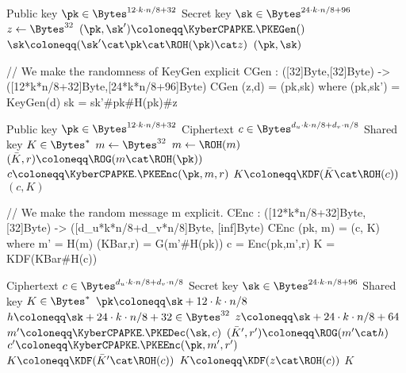\begin{algorithm}
  \caption{$\KyberCCAKEM.\KEMGen()$
  \label{alg:ccakeygen}}
  \begin{algorithmic}[1]
    \Ensure Public key $\pk \in \Bytes^{12\cdot k\cdot n/8 + 32}$
    \Ensure Secret key $\sk \in \Bytes^{24\cdot k\cdot n/8 + 96}$
    \State $z \gets \Bytes^{32}$
    \State $(\pk,\sk') \coloneqq \KyberCPAPKE.\PKEGen()$
    \State $\sk \coloneqq (\sk'\cat \pk\cat \ROH(\pk)\cat z)$
    \State \Return $(\pk, \sk)$
  \end{algorithmic}
\end{algorithm}

\begin{code}
  // We make the randomness of KeyGen explicit
  CGen : ([32]Byte,[32]Byte) -> ([12*k*n/8+32]Byte,[24*k*n/8+96]Byte)
  CGen (z,d) = (pk,sk) where
    (pk,sk') = KeyGen(d)
    sk = sk'#pk#H(pk)#z
\end{code}

\begin{algorithm}
  \caption{$\KyberCCAKEM.\KEMEnc(\pk)$
  \label{alg:ccaenc}}
  \begin{algorithmic}[1]
    \Require Public key $\pk \in \Bytes^{12\cdot k\cdot n/8 + 32}$
    \Ensure Ciphertext $c \in \Bytes^{d_u\cdot k\cdot n/8 + d_v\cdot n/8}$
    \Ensure Shared key $K \in \Bytes^*$
    \State $m\gets \Bytes^{32}$\label{line:ccaenc:m}
    \State $m\gets \ROH(m)$
    \State $(\bar{K},r) \coloneqq \ROG(m\cat \ROH(\pk))$\label{line:ccaenc:r}
    \State $c \coloneqq \KyberCPAPKE.\PKEEnc(\pk, m, r)$
    \State $K \coloneqq \KDF(\bar{K}\cat \ROH(c))$\label{line:ccaenc:k}
    \State \Return $(c, K)$
  \end{algorithmic}
\end{algorithm}

\begin{code}
  // We make the random message m explicit.
  CEnc : ([12*k*n/8+32]Byte, [32]Byte) -> ([d_u*k*n/8+d_v*n/8]Byte, [inf]Byte)
  CEnc (pk, m) = (c, K) where
    m' = H(m)
    (KBar,r) = G(m'#H(pk))
    c = Enc(pk,m',r)
    K = KDF(KBar#H(c))
\end{code}

\begin{algorithm}
  \caption{$\KyberCCAKEM.\KEMDec(c,\sk)$\label{alg:ccadec}}
  \begin{algorithmic}[1]
    \Require Ciphertext $c \in \Bytes^{d_u\cdot k\cdot n/8 + d_v\cdot n/8}$
    \Require Secret key $\sk \in \Bytes^{24\cdot k\cdot n/8 + 96}$
    \Ensure Shared key $K \in \Bytes^*$
    \State $\pk \coloneqq \sk+12\cdot k\cdot n/8$
    \State $h \coloneqq \sk+24\cdot k\cdot n/8 + 32 \in \Bytes^{32}$
    \State $z \coloneqq \sk+24\cdot k\cdot n/8 + 64$
    \State $m'\coloneqq \KyberCPAPKE.\PKEDec(\sk,c)$
    \State $(\bar{K}',r') \coloneqq \ROG(m'\cat h)$
    \State $c' \coloneqq \KyberCPAPKE.\PKEEnc(\pk, m', r')$
      \State \Return $K \coloneqq \KDF(\bar{K}'\cat \ROH(c))$
    \Else
      \State \Return $K \coloneqq \KDF(z\cat \ROH(c))$
    \EndIf 
    \State \Return $K$
  \end{algorithmic}
\end{algorithm}

